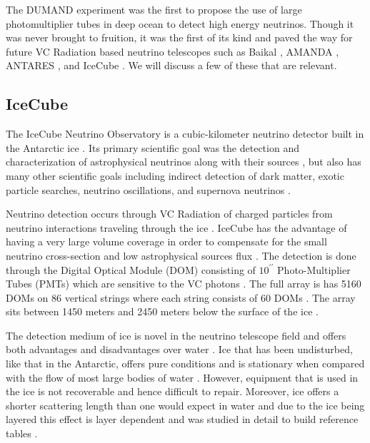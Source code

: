 The DUMAND experiment \cite{dumand} was the first to propose the use of large photomultiplier tubes in deep ocean to detect high energy neutrinos. Though it was never brought to fruition, it was the first of its kind and paved the way for future VC Radiation based neutrino telescopes such as Baikal \cite{baikal}, AMANDA \cite{amanda}, ANTARES \cite{antares}, and IceCube \cite{icecube}. We will discuss a few of these that are relevant. 

\subsection{IceCube}

The IceCube Neutrino Observatory is a cubic-kilometer neutrino detector built in the Antarctic ice \cite{icecube}. Its primary scientific goal was the detection and characterization of astrophysical neutrinos along with their sources \cite{icecube}, but also has many other scientific goals including indirect detection of dark matter, exotic particle searches, neutrino oscillations, and supernova neutrinos \cite{icecube}.

Neutrino detection occurs through VC Radiation of charged particles from neutrino interactions traveling through the ice \cite{icecube}. IceCube has the advantage of having a very large volume coverage in order to compensate for the small neutrino cross-section and low astrophysical sources flux \cite{icecube}. The detection is done through the Digital Optical Module (DOM) consisting of $10^{\prime\prime}$ Photo-Multiplier Tubes (PMTs) which are sensitive to the VC photons \cite{icecube}. The full array is has 5160 DOMs on 86 vertical strings where each string consists of 60 DOMs \cite{icecube}. The array sits between 1450 meters and 2450 meters below the surface of the ice \cite{icecube}.

The detection medium of ice is novel in the neutrino telescope field and offers both advantages and disadvantages over water \cite{icecube_rad}. Ice that has been undisturbed, like that in the Antarctic, offers pure conditions and is stationary when compared with the flow of most large bodies of water \cite{icecube_rad}. However, equipment that is used in the ice is not recoverable \cite{icecube_rad} and hence difficult to repair. Moreover, ice offers a shorter scattering length than one would expect in water \cite{icecube_rad} and due to the ice being layered this effect is layer dependent and was studied in detail to build reference tables \cite{icecube_rad}.

